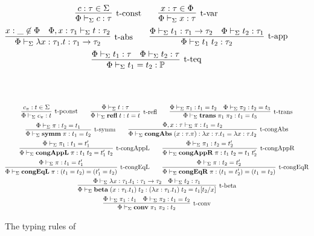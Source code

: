 \documentclass[10pt]{article}
\begin{document}
\begin{figure}[ht!]
\begin{gather*}  
\infer[\mbox{\typconst}]{
  \typeof{\Sigma}{\Phi}{c}{\tau}
}{
  c:\tau \in \Sigma
}
\qquad
\infer[\mbox{\typvar}]{
  \typeof{\Sigma}{\Phi}{x}{\tau}
}{
  x:\tau \in \Phi
}
\\
\infer[\mbox{\typabs}]{
  \typeof{\Sigma}{\Phi}{\tabs{x}{\tau_1}{t}}{\tau_1 \to \tau_2}
}{
  x:\_ \not\in\Phi 
  &
  \typeof{\Sigma}{\Phi,x:\tau_1}{t}{\tau_2}
}
\qquad
\infer[\mbox{\typapp}]{
  \typeof{\Sigma}{\Phi}{t_1\app t_2}{\tau_2}
}{
  \typeof{\Sigma}{\Phi}{t_1}{\tau_1 \to \tau_2}
  &
  \typeof{\Sigma}{\Phi}{t_2}{\tau_1}
}
\\
\infer[\mbox{\typteq}]{
  \typeof{\Sigma}{\Phi}{t_1 = t_2}{\prop}
}{
  \typeof{\Sigma}{\Phi}{t_1}{\tau}
  &
  \typeof{\Sigma}{\Phi}{t_2}{\tau}
}
\end{gather*}
\\
\\
\begin{gather*}
\infer[\mbox{\typpconst}]{
  \typeof{\Sigma}{\Phi}{c_\pi}{t}
}{
  c_\pi:t \in \Sigma
}
\qquad
\infer[\mbox{\typrefl}]{
  \typeof{\Sigma}{\Phi}{\refl t}{t = t}
}{
  \typeof{\Sigma}{\Phi}{t}{\tau}
}
\qquad
\infer[\mbox{\typtrans}]{
  \typeof{\Sigma}{\Phi}{\trans{\pi_1}{\pi_2}}{t_1 = t_3}
}{
  \typeof{\Sigma}{\Phi}{\pi_1}{t_1 = t_2}
  &
  \typeof{\Sigma}{\Phi}{\pi_2}{t_2 = t_3}
}
\\
\infer[\mbox{\typsymm}]{
  \typeof{\Sigma}{\Phi}{\symm{\pi}}{t_1 = t_2}
}{
  \typeof{\Sigma}{\Phi}{\pi}{t_2 = t_1}
}
\qquad
\infer[\mbox{\typcongabs}]{
  \typeof{\Sigma}{\Phi}{\congtabs{x}{\tau}{\pi}}{\tabs{x}{\tau}{t_1} = \tabs{x}{\tau}{t_2}}
}{
  \typeof{\Sigma}{\Phi,x:\tau}{\pi}{t_1 = t_2}
}
\\
\infer[\mbox{\typcongappl}]{
  \typeof{\Sigma}{\Phi}{\congappl{\pi}}{t_1\app t_2 = t_1'\app t_2}
}{
  \typeof{\Sigma}{\Phi}{\pi_1}{t_1 = t_1'}
}
\qquad
\infer[\mbox{\typcongappr}]{
  \typeof{\Sigma}{\Phi}{\congappr{\pi}}{t_1\app t_2 = t_1\app t_2'}
}{
  \typeof{\Sigma}{\Phi}{\pi_1}{t_2 = t_2'}
}
\\
\infer[\mbox{\typcongeql}]{
  \typeof{\Sigma}{\Phi}{\congeql{\pi}}{(t_1 = t_2) = (t_1' = t_2)}
}{
  \typeof{\Sigma}{\Phi}{\pi}{t_1 = t_1'}
}
\qquad
\infer[\mbox{\typcongeqr}]{
  \typeof{\Sigma}{\Phi}{\congeqr{\pi}}{(t_1 = t_2') = (t_1 = t_2)}
}{
  \typeof{\Sigma}{\Phi}{\pi}{t_2 = t_2'}
}
\\
\infer[\mbox{\typbeta}]{
  \typeof{\Sigma}{\Phi}{\tbetaconv{x}{\tau_1}{t_1}{t_2}}{(\tabs{x}{\tau_1}{t_1})\app t_2 = t_1[t_2/x]}
}{
  \typeof{\Sigma}{\Phi}{\tabs{x}{\tau_1}{t_1}}{\tau_1 \to \tau_2}
  &
  \typeof{\Sigma}{\Phi}{t_2}{\tau_1}
}
\\
\infer[\mbox{\typconv}]{
  \typeof{\Sigma}{\Phi}{\conv{\pi_1}{\pi_2}}{t_2}
}{
  \typeof{\Sigma}{\Phi}{\pi_1}{t_1}
  &
  \typeof{\Sigma}{\Phi}{\pi_2}{t_1 = t_2}
}
\end{gather*}  
  
\caption{The typing rules of \STLCE}
\label{fig:stlce-typing-rules}
\end{figure}
\end{document}
